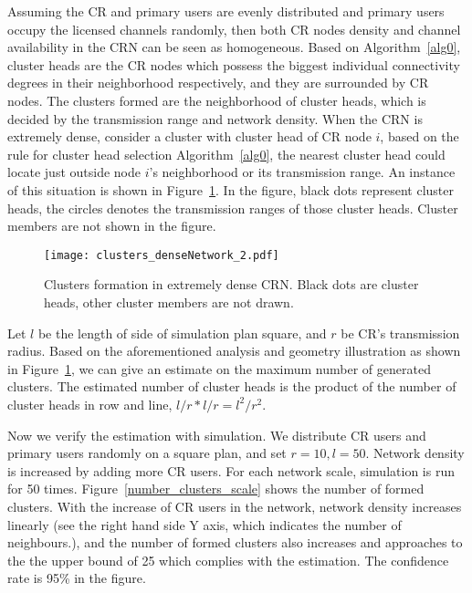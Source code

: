 \documentclass[journal,comsoc]{IEEEtran}
\theoremstyle{mytheoremstyle}
\theoremstyle{mytheoremstyle}
\theoremstyle{mytheoremstyle}
\begin{document}
Assuming the CR and primary users are evenly distributed and primary users occupy the licensed channels randomly, then both CR nodes density and channel availability in the CRN can be seen as homogeneous.
Based on Algorithm~\ref{alg0}, cluster heads are the CR nodes which possess the biggest individual connectivity degrees in their neighborhood respectively, and they are surrounded by CR nodes.
The clusters formed are the neighborhood of cluster heads, which is decided by the transmission range and network density.
When the CRN is extremely dense, consider a cluster with cluster head of CR node $i$, based on the rule for cluster head selection Algorithm~\ref{alg0}, the nearest cluster head could locate just outside node $i$'s neighborhood or its transmission range.
An instance of this situation is shown in Figure~\ref{clusters_denseNetwork}.
%
In the figure, black dots represent cluster heads, the circles denotes the transmission ranges of those cluster heads.
Cluster members are not shown in the figure.
\begin{figure}[h!]
  \centering
  \texttt{[image: clusters\_denseNetwork\_2.pdf]}
  \caption{Clusters formation in extremely dense CRN. Black dots are cluster heads, other cluster members are not drawn.}
  \label{clusters_denseNetwork}
\end{figure}
Let $l$ be the length of side of simulation plan square, and $r$ be CR's transmission radius.
Based on the aforementioned analysis and geometry illustration as shown in Figure~\ref{clusters_denseNetwork}, we can give an estimate on the maximum number of generated clusters.
The estimated number of cluster heads is the product of the number of cluster heads in row and line, $l/r * l/r = l^2/r^2$.

Now we verify the estimation with simulation.
We distribute CR users and primary users randomly on a square plan, and set $r=10, l=50$.
Network density is increased by adding more CR users.
For each network scale, simulation is run for 50 times.
Figure~\ref{number_clusters_scale} shows the number of formed clusters.
With the increase of CR users in the network, network density increases linearly (see the right hand side Y axis, which indicates the number of neighbours.), and the number of formed clusters also increases and approaches to the the upper bound of 25 which complies with the estimation.
The confidence rate is 95\% in the figure.
\end{document}
